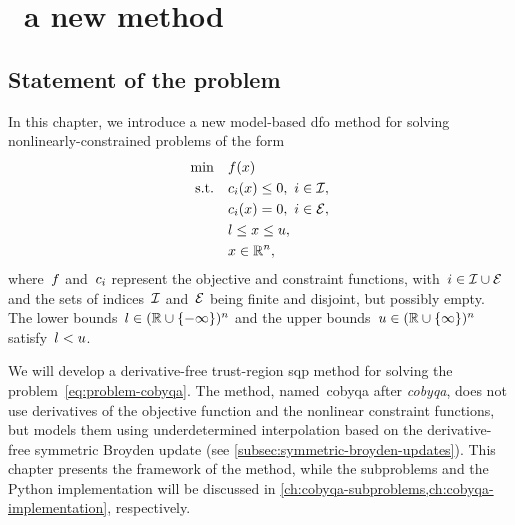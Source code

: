 %
%
%
\chapter{ \textemdash\ a new  method}
\label{ch:cobyqa-introduction}

\section{Statement of the problem}

In this chapter, we introduce a new model-based \gls{dfo} method for solving nonlinearly-constrained problems of the form
\begin{subequations}
    \label{eq:problem-cobyqa}
    \begin{align}
        \min        & \quad \obj(\iter)\\
        \text{s.t.} & \quad \con{i}(\iter) \le 0, ~ i \in \iub, \label{eq:problem-cobyqa-ub}\\
                    & \quad \con{i}(\iter) = 0, ~ i \in \ieq,\\
                    & \quad \xl \le x \le \xu, \label{eq:problem-cobyqa-bd}\\
                    & \quad \iter \in \R^n, \nonumber
    \end{align}
\end{subequations}
where~$f$ and~$c_{i}$ represent the objective and constraint functions, with~$i \in \mathcal{I} \cup \mathcal{E}$ and the sets of indices~$\mathcal{I}$ and~$\mathcal{E}$ being finite and disjoint, but possibly empty. 
The lower bounds~$l \in (\mathbb{R} \cup \{-\infty\})^n$ and the upper bounds~$u \in (\mathbb{R} \cup \{\infty\})^n$ satisfy~$l < u$.

We will develop a derivative-free trust-region \gls{sqp} method for solving the problem~\cref{eq:problem-cobyqa}.
The method, named~\gls{cobyqa} after \emph{\glsdesc{cobyqa}}, does not use derivatives of the objective function and the nonlinear constraint functions, but models them using underdetermined interpolation based on the derivative-free symmetric Broyden update (see \cref{subsec:symmetric-broyden-updates}).
This chapter presents the framework of the method, while the subproblems and the Python implementation will be discussed in \cref{ch:cobyqa-subproblems,ch:cobyqa-implementation}, respectively.

